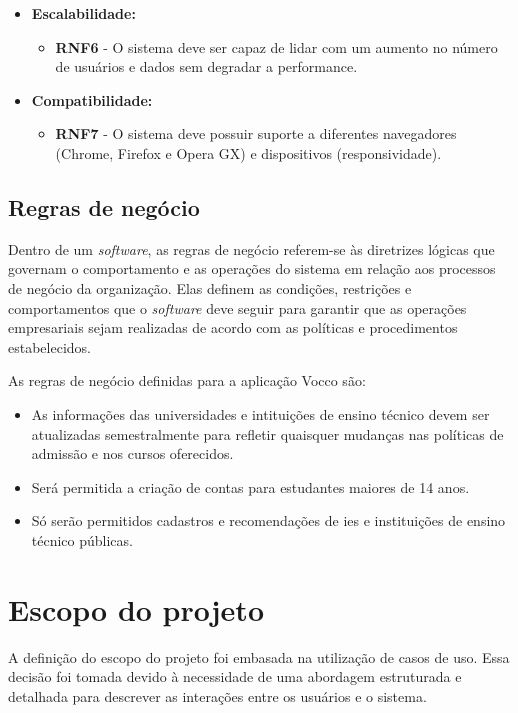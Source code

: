 \begin{itemize}
    \item \textbf{Escalabilidade:}
    \begin{itemize}
        \item \textbf{RNF6} - O sistema deve ser capaz de lidar com um aumento no número de usuários e dados sem degradar a performance.
    \end{itemize}

    \item \textbf{Compatibilidade:}
    \begin{itemize}
        \item \textbf{RNF7} - O sistema deve possuir suporte a diferentes navegadores (Chrome, Firefox e Opera GX) e dispositivos (responsividade).
    \end{itemize}

\end{itemize}



\subsection{Regras de negócio}

Dentro de um \textit{software}, as regras de negócio referem-se às diretrizes lógicas que governam o comportamento e as operações do sistema em relação aos processos de negócio da organização. Elas definem as condições, restrições e comportamentos que o \textit{software} deve seguir para garantir que as operações empresariais sejam realizadas de acordo com as políticas e procedimentos estabelecidos.

As regras de negócio definidas para a aplicação Vocco são:
\begin{itemize}
\item {As informações das universidades e intituições de ensino técnico devem ser atualizadas semestralmente para refletir quaisquer mudanças nas políticas de admissão e nos cursos oferecidos.}
\item {Será permitida a criação de contas para estudantes maiores de 14 anos.}
\item {Só serão permitidos cadastros e recomendações de \ac{ies} e instituições de ensino técnico públicas. 
}

\end{itemize}


\section{Escopo do projeto}
A definição do escopo do projeto foi embasada na utilização de casos de uso. Essa decisão foi tomada devido à necessidade de uma abordagem estruturada e detalhada para descrever as interações entre os usuários e o sistema. 


